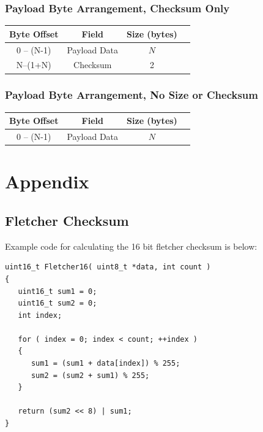 \documentclass{article}
\begin{document}
    \subsubsection{Payload Byte Arrangement, Checksum Only}
    
    \begin{center}
    \begin{tabular}{|c|c|c|c|}
    \hline
    \textbf{Byte Offset} & \textbf{Field} & \textbf{Size (bytes)} \\
    \hline
    0 -- (N-1) & Payload Data & $N$ \\
    \hline
    N--(1+N) & Checksum & 2\\
    \hline
    \end{tabular}
    \end{center}

    \subsubsection{Payload Byte Arrangement, No Size or Checksum}
    
    \begin{center}
    \begin{tabular}{|c|c|c|c|}
    \hline
    \textbf{Byte Offset} & \textbf{Field} & \textbf{Size (bytes)} \\
    \hline
    0 -- (N-1) & Payload Data & $N$ \\
    \hline
    \end{tabular}
    \end{center}


    \section{Appendix}

    \subsection{Fletcher Checksum}
    Example code for calculating the 16 bit fletcher checksum is below:

\begin{verbatim}
uint16_t Fletcher16( uint8_t *data, int count )
{
   uint16_t sum1 = 0;
   uint16_t sum2 = 0;
   int index;

   for ( index = 0; index < count; ++index )
   {
      sum1 = (sum1 + data[index]) % 255;
      sum2 = (sum2 + sum1) % 255;
   }

   return (sum2 << 8) | sum1;
}
\end{verbatim}
    
    
\end{document}
